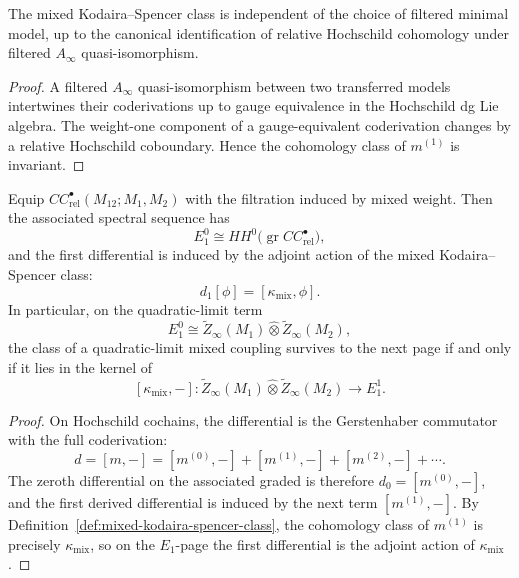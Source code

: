 \begin{lemma}
\label{lem:mixed-ks-well-defined}
The mixed Kodaira--Spencer class is independent of the choice of filtered minimal model, up to the canonical identification of relative Hochschild cohomology under filtered $A_\infty$ quasi-isomorphism.
\end{lemma}

\begin{proof}
A filtered $A_\infty$ quasi-isomorphism between two transferred models intertwines their coderivations up to gauge equivalence in the Hochschild dg Lie algebra. The weight-one component of a gauge-equivalent coderivation changes by a relative Hochschild coboundary. Hence the cohomology class of $m^{(1)}$ is invariant.
\end{proof}

\begin{theorem}
\label{thm:first-correction-theorem}
Equip $CC^\bullet_{\mathrm{rel}}(M_{12};M_1,M_2)$ with the filtration induced by mixed weight. Then the associated spectral sequence has
\[
E_1^0 \cong HH^0\bigl(\operatorname{gr} CC^\bullet_{\mathrm{rel}}\bigr),
\]
and the first differential is induced by the adjoint action of the mixed Kodaira--Spencer class:
\[
d_1[\phi] = [\kappa_{\mathrm{mix}},\phi].
\]
In particular, on the quadratic-limit term
\[
E_1^0 \cong \widetilde Z_\infty(M_1)\widehat\otimes \widetilde Z_\infty(M_2),
\]
the class of a quadratic-limit mixed coupling survives to the next page if and only if it lies in the kernel of
\[
[\kappa_{\mathrm{mix}},-] :
\widetilde Z_\infty(M_1)\widehat\otimes \widetilde Z_\infty(M_2)
\longrightarrow E_1^1.
\]
\end{theorem}

\begin{proof}
On Hochschild cochains, the differential is the Gerstenhaber commutator with the full coderivation:
\[
d = [m,-] = [m^{(0)},-] + [m^{(1)},-] + [m^{(2)},-] + \cdots.
\]
The zeroth differential on the associated graded is therefore $d_0=[m^{(0)},-]$, and the first derived differential is induced by the next term $[m^{(1)},-]$. By Definition~\ref{def:mixed-kodaira-spencer-class}, the cohomology class of $m^{(1)}$ is precisely $\kappa_{\mathrm{mix}}$, so on the $E_1$-page the first differential is the adjoint action of $\kappa_{\mathrm{mix}}$.
\end{proof}


